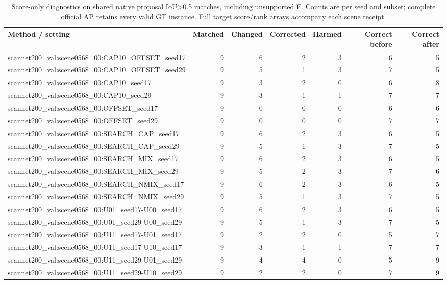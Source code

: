 \begin{table}[t]
\centering
\small
\caption{Score-only diagnostics on shared native proposal IoU\textgreater{}0.5 matches, including unsupported F. Counts are per seed and subset; complete official AP retains every valid GT instance. Full target score/rank arrays accompany each scene receipt.}
\label{tab:benchmark-s7}
\begin{tabular}{lrrrrrr}
\toprule
Method / setting & Matched & Changed & Corrected & Harmed & Correct before & Correct after \\
\midrule
scannet200\_val:scene0568\_00:CAP10\_OFFSET\_seed17 & 9 & 6 & 2 & 3 & 6 & 5 \\
scannet200\_val:scene0568\_00:CAP10\_OFFSET\_seed29 & 9 & 5 & 1 & 3 & 7 & 5 \\
scannet200\_val:scene0568\_00:CAP10\_seed17 & 9 & 3 & 2 & 0 & 6 & 8 \\
scannet200\_val:scene0568\_00:CAP10\_seed29 & 9 & 3 & 1 & 1 & 7 & 7 \\
scannet200\_val:scene0568\_00:OFFSET\_seed17 & 9 & 0 & 0 & 0 & 6 & 6 \\
scannet200\_val:scene0568\_00:OFFSET\_seed29 & 9 & 0 & 0 & 0 & 7 & 7 \\
scannet200\_val:scene0568\_00:SEARCH\_CAP\_seed17 & 9 & 6 & 2 & 3 & 6 & 5 \\
scannet200\_val:scene0568\_00:SEARCH\_CAP\_seed29 & 9 & 5 & 1 & 3 & 7 & 5 \\
scannet200\_val:scene0568\_00:SEARCH\_MIX\_seed17 & 9 & 6 & 2 & 3 & 6 & 5 \\
scannet200\_val:scene0568\_00:SEARCH\_MIX\_seed29 & 9 & 5 & 2 & 3 & 7 & 6 \\
scannet200\_val:scene0568\_00:SEARCH\_NMIX\_seed17 & 9 & 6 & 2 & 3 & 6 & 5 \\
scannet200\_val:scene0568\_00:SEARCH\_NMIX\_seed29 & 9 & 5 & 1 & 3 & 7 & 5 \\
scannet200\_val:scene0568\_00:U01\_seed17-U00\_seed17 & 9 & 6 & 2 & 3 & 6 & 5 \\
scannet200\_val:scene0568\_00:U01\_seed29-U00\_seed29 & 9 & 5 & 1 & 3 & 7 & 5 \\
scannet200\_val:scene0568\_00:U11\_seed17-U01\_seed17 & 9 & 2 & 2 & 0 & 5 & 7 \\
scannet200\_val:scene0568\_00:U11\_seed17-U10\_seed17 & 9 & 3 & 1 & 1 & 7 & 7 \\
scannet200\_val:scene0568\_00:U11\_seed29-U01\_seed29 & 9 & 4 & 4 & 0 & 5 & 9 \\
scannet200\_val:scene0568\_00:U11\_seed29-U10\_seed29 & 9 & 2 & 2 & 0 & 7 & 9 \\

\end{tabular}
\end{table}

